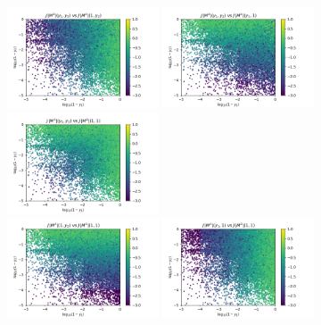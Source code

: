\documentclass[a4paper,10pt]{article}
\begin{document}
%
\begin{figure}
    \centering
    \includegraphics[width=0.4\textwidth, trim=0.2cm 0 1.8cm 0, clip]{figures/ratio_JAC.ME_0_1.png}
    \includegraphics[width=0.4\textwidth, trim=0.2cm 0 1.8cm 0, clip]{figures/ratio_JAC.ME_0_2.png}\\
    \includegraphics[width=0.4\textwidth, trim=0.2cm 0 1.8cm 0, clip]{figures/ratio_JAC.ME_0_3.png}\\
    \includegraphics[width=0.4\textwidth, trim=0.2cm 0 1.8cm 0, clip]{figures/ratio_JAC.ME_1_3.png}
    \includegraphics[width=0.4\textwidth, trim=0.2cm 0 1.8cm 0, clip]{figures/ratio_JAC.ME_2_3.png}
\end{figure}
\end{document}
